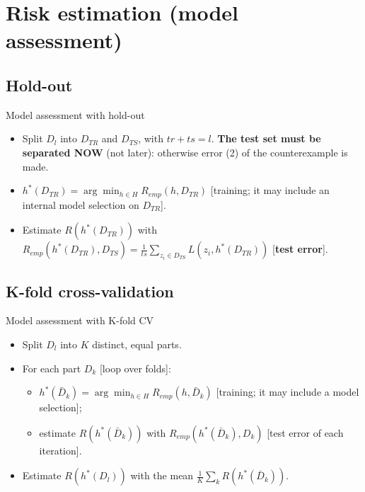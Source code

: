 \section{Risk estimation (model
assessment)}\label{stima-del-rischio-model-assessment}

\subsection{Hold-out}\label{hold-out-1}

\begin{boxabstract}{Model assessment with hold-out}

\begin{itemize}
\tightlist
\item
  Split \(D_l\) into \(D_{TR}\) and \(D_{TS}\), with \(tr + ts = l\).
  \textbf{The test set must be separated NOW} (not later): otherwise
  error (2) of the counterexample is made.
\item
  \(h^*(D_{TR}) = \arg\min_{h \in H} R_{emp}(h, D_{TR})\) {[}training;
  it may include an internal model selection on \(D_{TR}\){]}.
\item
  Estimate \(R(h^*(D_{TR}))\) with
  \(R_{emp}(h^*(D_{TR}), D_{TS}) = \frac{1}{ts}\sum_{z_i \in D_{TS}} L(z_i, h^*(D_{TR}))\)
  {[}\textbf{test error}{]}.
\end{itemize}

\end{boxabstract}

\subsection{K-fold cross-validation}\label{k-fold-cross-validation-1}

\begin{boxabstract}{Model assessment with K-fold CV}

\begin{itemize}
\tightlist
\item
  Split \(D_l\) into \(K\) distinct, equal parts.
\item
  For each part \(D_k\) {[}loop over folds{]}:

  \begin{itemize}
  \tightlist
  \item
    \(h^*(\bar D_k) = \arg\min_{h \in H} R_{emp}(h, \bar D_k)\)
    {[}training; it may include a model selection{]};
  \item
    estimate \(R(h^*(\bar D_k))\) with \(R_{emp}(h^*(\bar D_k), D_k)\)
    {[}test error of each iteration{]}.
  \end{itemize}
\item
  Estimate \(R(h^*(D_l))\) with the mean
  \(\frac{1}{K}\sum_k R(h^*(\bar D_k))\).
\end{itemize}

\end{boxabstract}

